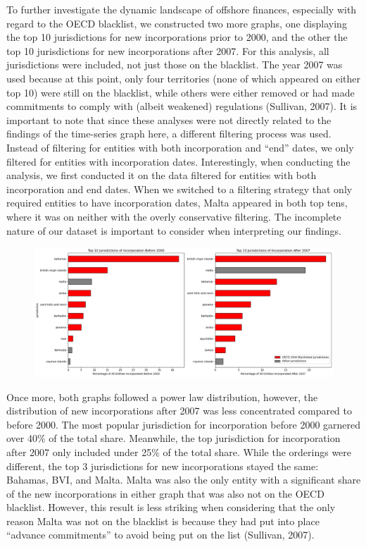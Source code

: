 \documentclass{article}
\begin{document}
To further investigate the dynamic landscape of offshore finances, especially with regard to the OECD blacklist, we constructed two more graphs, one displaying the top 10 jurisdictions for new incorporations prior to 2000, and the other the top 10 jurisdictions for new incorporations after 2007. For this analysis, all jurisdictions were included, not just those on the blacklist. The year 2007 was used because at this point, only four territories (none of which appeared on either top 10) were still on the blacklist, while others were either removed or had made commitments to comply with (albeit weakened) regulations (Sullivan, 2007). It is important to note that since these analyses were not directly related to the findings of the time-series graph here, a different filtering process was used. Instead of filtering for entities with both incorporation and “end” dates, we only filtered for entities with incorporation dates. Interestingly, when conducting the analysis, we first conducted it on the data filtered for entities with both incorporation and end dates. When we switched to a filtering strategy that only required entities to have incorporation dates, Malta appeared in both top tens, where it was on neither with the overly conservative filtering. The incomplete nature of our dataset is important to consider when interpreting our findings.

\begin{figure}[H]
  \centering
    \caption{} 
  \label{fig:fig9}
  \includegraphics[width=\textwidth]{Figure 9.png}
\end{figure}

Once more, both graphs followed a power law distribution, however, the distribution of new incorporations after 2007 was less concentrated compared to before 2000. The most popular jurisdiction for incorporation before 2000 garnered over 40\% of the total share. Meanwhile, the top jurisdiction for incorporation after 2007 only included under 25\% of the total share. While the orderings were different, the top 3 jurisdictions for new incorporations stayed the same: Bahamas, BVI, and Malta. Malta was also the only entity with a significant share of the new incorporations in either graph that was also not on the OECD blacklist. However, this result is less striking when considering that the only reason Malta was not on the blacklist is because they had put into place “advance commitments” to avoid being put on the list (Sullivan, 2007).
\end{document}
